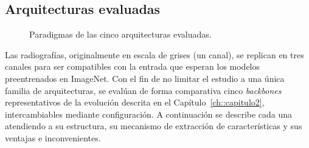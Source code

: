\subsection{Arquitecturas evaluadas}

\begin{figure}[ht]
\centering
{}
\caption{Paradigmas de las cinco arquitecturas evaluadas.}
\label{fig::mm_arquitecturas}
\end{figure}

Las radiografías, originalmente en escala de grises (un canal), se replican en
tres canales para ser compatibles con la entrada que esperan los modelos
preentrenados en ImageNet. Con el fin de no limitar el estudio a una única
familia de arquitecturas, se evalúan de forma comparativa cinco \textit{backbones}
representativos de la evolución descrita en el Capítulo~\ref{ch::capitulo2},
intercambiables mediante configuración. A continuación se describe cada una atendiendo
a su estructura, su mecanismo de extracción de características y sus ventajas e
inconvenientes.

